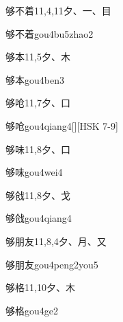 \begin{Entry}{够不着}{11,4,11}{⼣、⼀、⽬}
  \begin{Phonetics}{够不着}{gou4bu5zhao2}
  \end{Phonetics}
\end{Entry}

\begin{Entry}{够本}{11,5}{⼣、⽊}
  \begin{Phonetics}{够本}{gou4ben3}
  \end{Phonetics}
\end{Entry}

\begin{Entry}{够呛}{11,7}{⼣、⼝}
  \begin{Phonetics}{够呛}{gou4qiang4}[][HSK 7-9]
  \end{Phonetics}
\end{Entry}

\begin{Entry}{够味}{11,8}{⼣、⼝}
  \begin{Phonetics}{够味}{gou4wei4}
  \end{Phonetics}
\end{Entry}

\begin{Entry}{够戗}{11,8}{⼣、⼽}
  \begin{Phonetics}{够戗}{gou4qiang4}
  \end{Phonetics}
\end{Entry}

\begin{Entry}{够朋友}{11,8,4}{⼣、⽉、⼜}
  \begin{Phonetics}{够朋友}{gou4peng2you5}
  \end{Phonetics}
\end{Entry}

\begin{Entry}{够格}{11,10}{⼣、⽊}
  \begin{Phonetics}{够格}{gou4ge2}
  \end{Phonetics}
\end{Entry}


